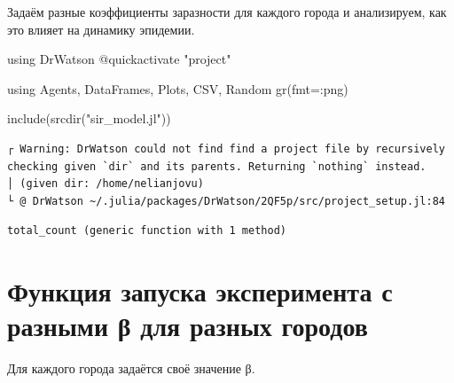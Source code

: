 \documentclass[
  12pt,
  a4paper,
  DIV=11,
  numbers=noendperiod]{scrreprt}
\newenvironment{Shaded}{\begin{snugshade}}{\end{snugshade}}
\newcommand{\BuiltInTok}[1]{\textcolor[rgb]{0.00,0.23,0.31}{#1}}
\newcommand{\FunctionTok}[1]{\textcolor[rgb]{0.28,0.35,0.67}{#1}}
\newcommand{\ImportTok}[1]{\textcolor[rgb]{0.00,0.46,0.62}{#1}}
\newcommand{\NormalTok}[1]{\textcolor[rgb]{0.00,0.23,0.31}{#1}}
\newcommand{\OperatorTok}[1]{\textcolor[rgb]{0.37,0.37,0.37}{#1}}
\newcommand{\PreprocessorTok}[1]{\textcolor[rgb]{0.68,0.00,0.00}{#1}}
\newcommand{\StringTok}[1]{\textcolor[rgb]{0.13,0.47,0.30}{#1}}
\begin{document}
Задаём разные коэффициенты заразности для каждого города и анализируем,
как это влияет на динамику эпидемии.

\begin{Shaded}
\begin{Highlighting}[]
\ImportTok{using} \BuiltInTok{DrWatson}
\PreprocessorTok{@quickactivate} \StringTok{"project"}

\ImportTok{using} \BuiltInTok{Agents}\NormalTok{, }\BuiltInTok{DataFrames}\NormalTok{, }\BuiltInTok{Plots}\NormalTok{, }\BuiltInTok{CSV}\NormalTok{, }\BuiltInTok{Random}
\FunctionTok{gr}\NormalTok{(fmt}\OperatorTok{=:}\NormalTok{png)}

\FunctionTok{include}\NormalTok{(}\FunctionTok{srcdir}\NormalTok{(}\StringTok{"sir\_model.jl"}\NormalTok{))}
\end{Highlighting}
\end{Shaded}

\begin{verbatim}
┌ Warning: DrWatson could not find find a project file by recursively checking given `dir` and its parents. Returning `nothing` instead.
│ (given dir: /home/nelianjovu)
└ @ DrWatson ~/.julia/packages/DrWatson/2QF5p/src/project_setup.jl:84
\end{verbatim}

\begin{verbatim}
total_count (generic function with 1 method)
\end{verbatim}

\section{Функция запуска эксперимента с разными β для разных
городов}\label{ux444ux443ux43dux43aux446ux438ux44f-ux437ux430ux43fux443ux441ux43aux430-ux44dux43aux441ux43fux435ux440ux438ux43cux435ux43dux442ux430-ux441-ux440ux430ux437ux43dux44bux43cux438-ux3b2-ux434ux43bux44f-ux440ux430ux437ux43dux44bux445-ux433ux43eux440ux43eux434ux43eux432}

Для каждого города задаётся своё значение β.
\end{document}
